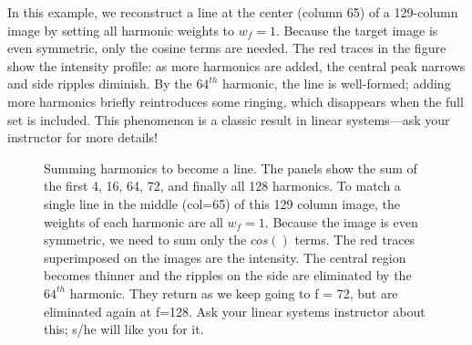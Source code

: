 \documentclass[
  letterpaper,
]{book}
\begin{document}
In this example, we reconstruct a line at the center (column 65) of a
129-column image by setting all harmonic weights to \(w_f = 1\). Because
the target image is even symmetric, only the cosine terms are needed.
The red traces in the figure show the intensity profile: as more
harmonics are added, the central peak narrows and side ripples diminish.
By the \(64^{th}\) harmonic, the line is well-formed; adding more
harmonics briefly reintroduces some ringing, which disappears when the
full set is included. This phenomenon is a classic result in linear
systems---ask your instructor for more details!

\begin{figure}


\caption{\label{fig-optics-reconstruction}Summing harmonics to become a
line. The panels show the sum of the first 4, 16, 64, 72, and finally
all 128 harmonics. To match a single line in the middle (col=65) of this
129 column image, the weights of each harmonic are all \(w_f = 1\).
Because the image is even symmetric, we need to sum only the \(cos()\)
terms. The red traces superimposed on the images are the intensity. The
central region becomes thinner and the ripples on the side are
eliminated by the \(64^{th}\) harmonic. They return as we keep going to
f = 72, but are eliminated again at f=128. Ask your linear systems
instructor about this; s/he will like you for it.}

\end{figure}%
\end{document}
